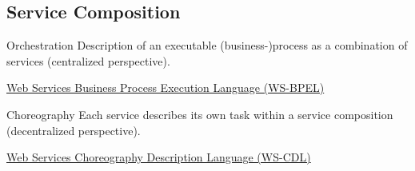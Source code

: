 \subsection{Service Composition}
\begin{frame}{\myframetitle}
	\begin{mycolumns}[t]
		\begin{definition}{Orchestration }
			Description of an executable (business-)process as a combination of services (centralized perspective).
		\end{definition}
		\begin{example}{}
			\href{https://docs.oasis-open.org/wsbpel/2.0/wsbpel-v2.0.html}{Web Services Business Process Execution Language (WS-BPEL)}
		\end{example}

		\centering{}
	\mynextcolumn
		\begin{definition}{Choreography }
			Each service describes its own task within a service composition (decentralized perspective).
		\end{definition}
		\begin{example}{}
			\href{https://www.w3.org/TR/ws-cdl-10/}{Web Services Choreography Description Language (WS-CDL)}
		\end{example}

		\centering{}
	\end{mycolumns}	
\end{frame}